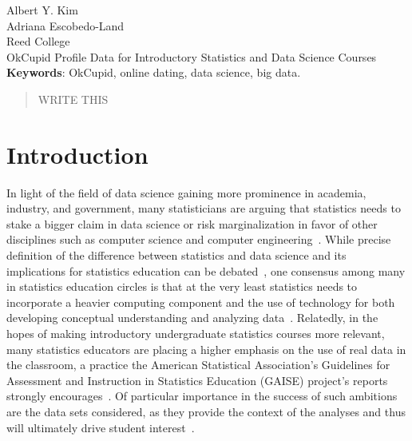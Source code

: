 \documentclass{article}\usepackage[]{graphicx}\usepackage[]{color}
\begin{document}
\noindent Albert Y. Kim\\
Adriana Escobedo-Land\\
Reed College\\
OkCupid Profile Data for Introductory Statistics and Data Science Courses\\

\noindent \textbf{Keywords}: OkCupid, online dating, data science, big data.

\begin{abstract}

WRITE THIS

\end{abstract}










%
\section{Introduction}\label{intro}
%
In light of the field of data science gaining more prominence in academia, industry, and government, many statisticians are arguing that statistics needs to stake a bigger claim in data science or risk marginalization in favor of other disciplines such as computer science and computer engineering~\cite{YU:2014,DAVIDSON:2014}.  While precise definition of the difference between statistics and data science and its implications for statistics education can be debated~\cite{WICKHAM:2014}, one consensus among many in statistics education circles is that at the very least statistics needs to incorporate a heavier computing component and the use of technology for both developing conceptual understanding and analyzing data~\cite{GAISE:05, NOLAN:LANG:2010}.  Relatedly, in the hopes of making introductory undergraduate statistics courses more relevant, many statistics educators are placing a higher emphasis on the use of real data in the classroom, a practice the American Statistical Association's Guidelines for Assessment and Instruction in Statistics Education (GAISE) project's reports strongly encourages~\cite{GAISE:05}.  Of particular importance in the success of such ambitions are the data sets considered, as they provide the context of the analyses and thus will ultimately drive student interest~\cite{GOULD:2010}.
\end{document}
